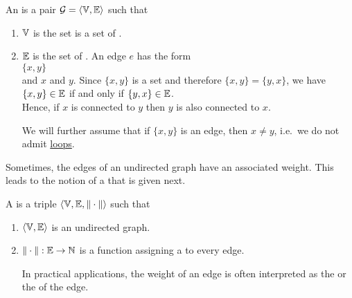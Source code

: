 \begin{Definition}
  An  is a pair
   $\mathcal{G} = \langle {\mathbb V}, {\mathbb E}\rangle$ such that
  \begin{enumerate}
  \item ${\mathbb V}$ is the set is a set of  .
  \item ${\mathbb E}$ is the set of  .  An edge $e$ has the form
        \\[0.2cm]
        \hspace*{1.3cm}
        $\{x, y\}$
        \\[0.2cm]
        and  $x$ and $y$.  Since $\{x,y\}$ is a set and therefore $\{x,y\} = \{y,x\}$, we have
        \\[0.2cm]
        \hspace*{1.3cm}
        $\{x,y\} \in {\mathbb E}$ \quad if and only if \quad $\{y,x\} \in {\mathbb E}$.
        \\[0.2cm]
        Hence, if $x$ is connected to $y$ then $y$ is also connected to $x$.

        We will further assume that if $\{x,y\}$ is an edge, then $x \not= y$, i.e.~we do not admit
        \href{https://en.wikipedia.org/wiki/Loop_(graph_theory)}{loops}. 
  \end{enumerate}
\end{Definition}

Sometimes, the edges of an undirected graph have an associated weight.  This leads to the notion of a
 that is given next.

\begin{Definition} A  is a triple 
   $\langle {\mathbb V}, {\mathbb E}, \|\cdot\| \rangle$ such that
  \begin{enumerate}
  \item $\langle {\mathbb V}, {\mathbb E} \rangle$ is an undirected graph.
  \item $\|\cdot\|: {\mathbb E} \rightarrow {\mathbb N}$ is a function assigning a  to every edge.

        In practical applications, the weight of an edge is often interpreted as the  or the
         of the edge.
        \eoxs
  \end{enumerate}
\end{Definition}

